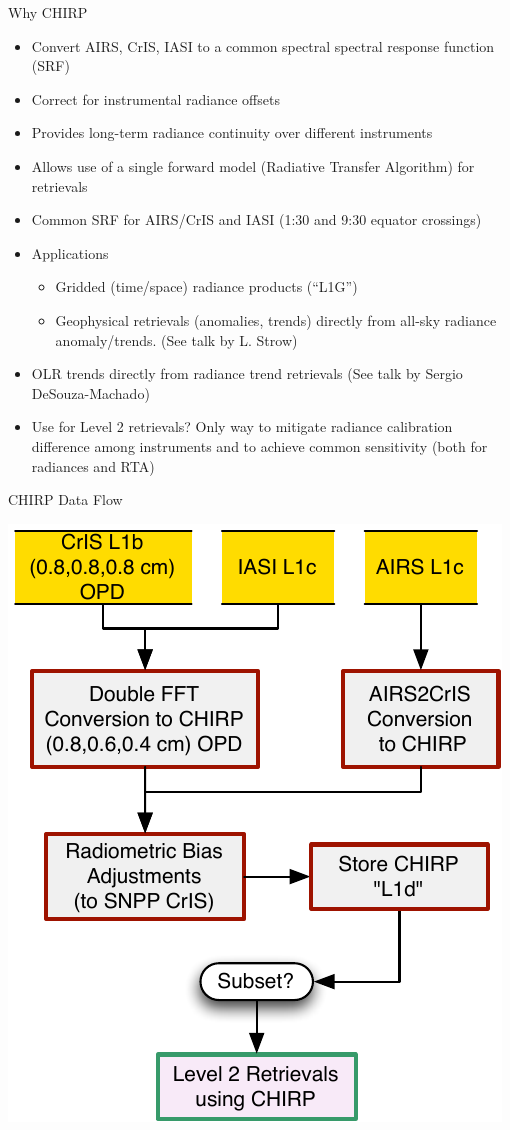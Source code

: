 \documentclass[10pt,t]{beamer}
\begin{document}
\begin{frame}[shrink=5,label={sec:org6b1374b}]{Why CHIRP}
\vspace{-0.2in}

\begin{itemize}
\item Convert AIRS, CrIS, IASI to a common spectral spectral response function
(SRF)
\item Correct for instrumental radiance offsets
\item Provides long-term radiance continuity over different instruments
\item Allows use of a single forward model (Radiative Transfer Algorithm) for
retrievals
\item Common SRF for AIRS/CrIS and IASI (1:30 and 9:30 equator crossings)
\item Applications
\begin{itemize}
\item Gridded (time/space) radiance products (“L1G”)
\item Geophysical retrievals (anomalies, trends) directly from all-sky radiance  anomaly/trends.  (See talk by L. Strow)
\end{itemize}
\item OLR trends directly from radiance trend retrievals (See talk by Sergio
DeSouza-Machado)
\item Use for Level 2 retrievals?  Only way to mitigate radiance calibration
difference among instruments and to achieve common sensitivity (both for
radiances and RTA)
\end{itemize}
\end{frame}






\begin{frame}[label={sec:orgf8c3420}]{CHIRP Data Flow}
\vspace{-0.1in}

\begin{center}
\includegraphics[width=0.6\linewidth]{./Figs/Pdf/airs2cris_stm_talk1_small.pdf}
\end{center}
\end{frame}
\end{document}
